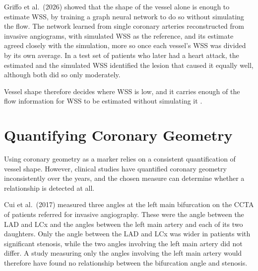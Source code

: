 Griffo et al.\ (2026) \cite{griffo2026wss} showed that the shape of the vessel alone is enough to
estimate WSS, by training a graph neural network to do so without simulating the flow.
The network learned from single coronary arteries reconstructed from invasive angiograms, with
simulated WSS as the reference, and its estimate agreed closely with the simulation, more so once
each vessel's WSS was divided by its own average.
In a test set of patients who later had a heart attack, the estimated and the simulated WSS
identified the lesion that caused it equally well, although both did so only moderately.

Vessel shape therefore decides where WSS is low, and it carries enough of the flow information for
WSS to be estimated without simulating it
\cite{kashyap2022tortuosity,garcha2025sensitivity,zhang2024curvature,griffo2026wss}.

\section{Quantifying Coronary Geometry}
\label{sec:lit-measure}

Using coronary geometry as a marker relies on a consistent quantification of vessel shape.
However, clinical studies have quantified coronary geometry inconsistently over the years, and the
chosen measure can determine whether a relationship is detected at all.

Cui et al.\ (2017) \cite{cui2017bifurcation} measured three angles at the left main bifurcation on
the CCTA of patients referred for invasive angiography.
These were the angle between the LAD and LCx and the angles between the left main artery and each of
its two daughters.
Only the angle between the LAD and LCx was wider in patients with significant stenosis, while the two
angles involving the left main artery did not differ.
A study measuring only the angles involving the left main artery would therefore have found no
relationship between the bifurcation angle and stenosis.

